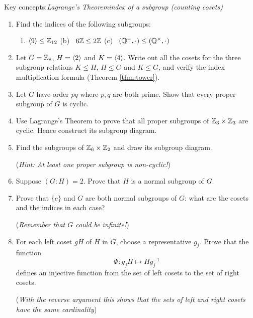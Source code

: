 \begin{exercises}
	Key concepts:\quad \emph{Lagrange's Theorem\qquad index of a subgroup (counting cosets)\qquad }

	
	\begin{enumerate}
	  \item Find the indices of the following subgroups:
		\begin{enumerate}
	  	\item $\left\langle 9\right\rangle\le\mathbb{Z}_{12}$\qquad\qquad
	  	(b) \ $6\mathbb{Z}\le 2\mathbb{Z}$\qquad\qquad
	  	(c) \ $(\mathbb{Q}^+,\cdot)\le(\mathbb{Q}^\times,\cdot)$
		\end{enumerate}


		\item Let $G=\mathbb{Z}_8$, $H=\left\langle 2\right\rangle$ and $K=\left\langle 4\right\rangle$. Write out all the cosets for the three subgroup relations $K\le H$, $H\le G$ and $K\le G$, and verify the index multiplication formula (Theorem \ref{thm:tower}).
	  
	  
		\item Let $G$ have order $pq$ where $p,q$ are both prime. Show that every proper subgroup of $G$ is cyclic.
		
		
		\item Use Lagrange's Theorem to prove that all proper subgroups of $\mathbb{Z}_3\times\mathbb{Z}_3$ are cyclic. Hence construct its subgroup diagram.
		
		
		\item Find the subgroups of $\mathbb{Z}_6\times\mathbb{Z}_2$ and draw its subgroup diagram.\par
		(\emph{Hint: At least one proper subgroup is \emph{non-cyclic}!})
		
		
		\item\label{exs:index2} Suppose $(G:H)=2$. Prove that $H$ is a normal subgroup of $G$.
		
	  
	  \item Prove that $\{e\}$ and $G$ are both normal subgroups of $G$: what are the cosets and the indices in each case?\par
	  (\emph{Remember that $G$ could be infinite!})
	  
	  
	  \item\label{exs:indexcard} For each left coset $gH$ of $H$ in $G$, choose a representative $g_j$. Prove that the function
	  \[
	  	\Phi:g_jH\mapsto Hg_j^{-1}
	  \]
	  defines an injective function from the set of left cosets to the set of right cosets.\par
	  (\emph{With the reverse argument this shows that the sets of left and right cosets have the same cardinality})
		

\end{enumerate}
\end{exercises}
